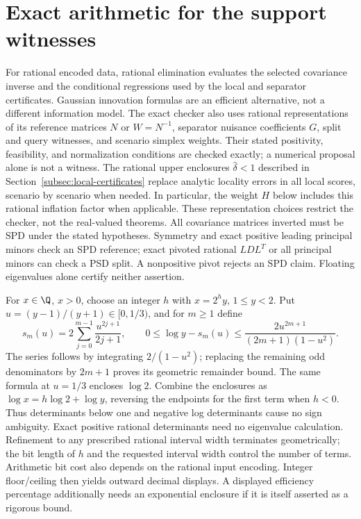 \section{Exact arithmetic for the support witnesses}
\label{app:certificate-arithmetic}

For rational encoded data, rational elimination evaluates the selected
covariance inverse and the conditional regressions used by the local and
separator certificates. Gaussian innovation formulas are an efficient
alternative, not a different information model. The exact checker also uses
rational representations of its reference matrices $N$ or $W=N^{-1}$,
separator nuisance coefficients $G$, split and query witnesses, and scenario
simplex weights. Their stated positivity, feasibility, and normalization
conditions are checked exactly; a numerical proposal alone is not a witness.
The rational upper enclosures $\widehat\delta<1$ described in
Section~\ref{subsec:local-certificates} replace analytic locality errors in
all local scores, scenario by scenario when needed. In particular, the
weight $H$ below includes this rational inflation factor when applicable.
These representation choices restrict the checker, not the real-valued
theorems. All covariance matrices
inverted must be SPD under the stated hypotheses. Symmetry and exact positive
leading principal minors check an SPD reference; exact pivoted rational
$LDL^T$ or all principal minors can check a PSD split. A nonpositive pivot
rejects an SPD claim. Floating eigenvalues alone certify neither assertion.

For $x\in\Q$, $x>0$, choose an integer $h$ with $x=2^h y$,
$1\le y<2$. Put $u=(y-1)/(y+1)\in[0,1/3)$, and for $m\ge1$ define
\begin{equation}\label{eq:rational-log}
 s_m(u)=2\sum_{j=0}^{m-1}\frac{u^{2j+1}}{2j+1},\qquad
 0\le\log y-s_m(u)\le
 \frac{2u^{2m+1}}{(2m+1)(1-u^2)}.
\end{equation}
The series follows by integrating $2/(1-u^2)$; replacing the remaining
odd denominators by $2m+1$ proves its geometric remainder bound.
The same formula at $u=1/3$ encloses $\log2$. Combine the enclosures as
$\log x=h\log2+\log y$, reversing the endpoints for the first term when
$h<0$. Thus determinants below one and negative log determinants cause no
sign ambiguity. Exact positive rational determinants need no eigenvalue
calculation. Refinement to any prescribed rational interval width terminates
geometrically; the bit length of $h$ and the requested interval width control the number
of terms. Arithmetic bit cost also depends on the rational input encoding. Integer floor/ceiling then yields outward decimal
displays. A displayed efficiency percentage additionally needs an exponential
enclosure if it is itself asserted as a rigorous bound.

